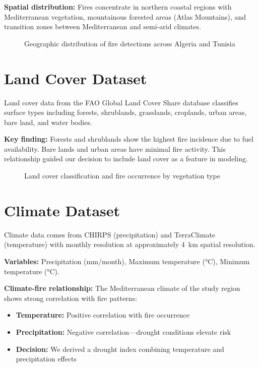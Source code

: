 \textbf{Spatial distribution:} Fires concentrate in northern coastal regions with Mediterranean vegetation, mountainous forested areas (Atlas Mountains), and transition zones between Mediterranean and semi-arid climates.

\begin{figure}[H]
    \centering
    \caption{Geographic distribution of fire detections across Algeria and Tunisia}
    \label{fig:fire_spatial}
\end{figure}

\section{Land Cover Dataset}
Land cover data from the FAO Global Land Cover Share database classifies surface types including forests, shrublands, grasslands, croplands, urban areas, bare land, and water bodies.

\textbf{Key finding:} Forests and shrublands show the highest fire incidence due to fuel availability. Bare lands and urban areas have minimal fire activity. This relationship guided our decision to include land cover as a feature in modeling.

\begin{figure}[H]
    \centering
    \caption{Land cover classification and fire occurrence by vegetation type}
    \label{fig:landcover}
\end{figure}

\section{Climate Dataset}
Climate data comes from CHIRPS (precipitation) and TerraClimate (temperature) with monthly resolution at approximately 4~km spatial resolution.

\textbf{Variables:} Precipitation (mm/month), Maximum temperature (°C), Minimum temperature (°C).

\textbf{Climate-fire relationship:} The Mediterranean climate of the study region shows strong correlation with fire patterns:
\begin{itemize}
    \item \textbf{Temperature:} Positive correlation with fire occurrence
    \item \textbf{Precipitation:} Negative correlation---drought conditions elevate risk
    \item \textbf{Decision:} We derived a drought index combining temperature and precipitation effects
\end{itemize}

